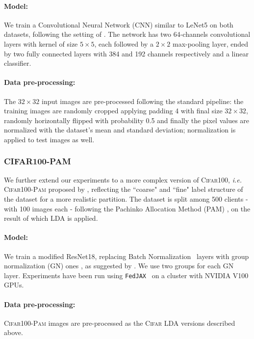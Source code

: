 \paragraph{Model:} We train a Convolutional Neural Network (CNN) similar to LeNet5 \cite{lecun1998gradient} on both datasets, following the setting of \cite{hsu2020federated}. The network has two 64-channels convolutional layers with kernel of size $5\times5$, each followed by a $2\times2$ max-pooling layer, ended by two fully connected layers with 384 and 192 channels respectively and a linear classifier. 
\paragraph{Data pre-processing:} The $32\times32$ input images are pre-processed following the standard pipeline: the training images are randomly cropped applying padding 4 with final size $32\times32$, randomly horizontally flipped with probability 0.5 and finally the pixel values are normalized with the dataset's mean and standard deviation; normalization is applied to test images as well.

\subsubsection{CIFAR100-PAM} We further extend our experiments to a more complex version of \textsc{Cifar100}, \textit{i.e.} \textsc{Cifar100-Pam} proposed by \cite{reddi2020adaptive}, reflecting the ``coarse" and ``fine" label structure of the dataset for a more realistic partition. The dataset is split among 500 clients - with 100 images each - following the Pachinko Allocation Method (PAM) \cite{li2006pachinko}, on the result of which LDA is applied. 
\paragraph{Model:} We train a modified ResNet18, replacing Batch Normalization~\cite{ioffe2015batch} layers with group normalization (GN) ones \cite{wu2018group}, as suggested by \cite{hsieh2020non}. We use two groups for each GN layer. Experiments have been run using \texttt{FedJAX}~\cite{ro2021fedjax} on a cluster with NVIDIA V100 GPUs.

\paragraph{Data pre-processing:} \textsc{Cifar100-Pam} images are pre-processed as the \textsc{Cifar} LDA versions described above.


